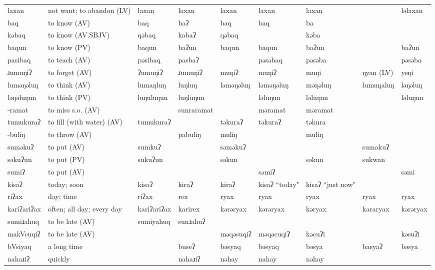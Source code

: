 \begin{landscape}
\begin{longtable}{*{9}{>{\raggedright\arraybackslash}p{}}}
\text{*}laxan & not want; to abandon (LV) & laxan & laxan & laxan & laxan & laxan &  & ləlaxan\\
\text{*}baq & to know (AV) & baq & baʔ & baq & baq & ba &  & \\
\text{*}kəbaq & to know (AV.SBJV) & qəbaq & kabaʔ & qəbaq &  & kəba &  & \\
\text{*}baqun & to know (PV) & baqun & baʔun & baqun & baqun & baʔun &  & baʔun\\
\text{*}pasibaq & to teach (AV) & pəsibaq & pasbaʔ &  & pəsəbaq & pəsəba &  & pəsəba\\
\text{*}ɹumuŋiʔ & to forget (AV) & ʔumuŋiʔ & ɹumuŋiʔ & muŋiʔ & muŋiʔ & muŋi & ŋyan (LV) & yeŋi\\
\text{*}luməŋəluŋ & to think (AV) & lumaŋluŋ & luŋluŋ & ləməŋəluŋ & ləməŋəluŋ & məŋəluŋ & lumuŋaluŋ & ləŋəluŋ\\
\text{*}ləŋəluŋun & to think (PV) & luŋuluŋun & luŋluŋun &  & ləluŋun & ləluŋun &  & ləluŋun\\
\text{*}-ramat & to miss s.o. (AV) &  & sunraramat &  & məramat & məramat &  & \\
\text{*}tumukuraʔ & to fill (with water) (AV) & tumukuraʔ &  & təkuraʔ & təkuraʔ & təkura &  & \\
\text{*}-buliŋ & to throw (AV) &  & pabuliŋ & muliŋ &  & muliŋ &  & \\
\text{*}suməkuʔ & to put (AV) & sumkuʔ &  & səməkuʔ &  &  & sumakuʔ & \\
\text{*}səkuʔun & to put (PV) & sukuʔun &  & səkun &  & səkun & sukwan & \\
\text{*}sumiʔ & to put (AV) &  &  &  & səmiʔ &  &  & səmi\\
\text{*}kisaʔ & today; soon & kisaʔ & kiraʔ & kiraʔ & kisaʔ ``today" & kisaʔ \newline ``just now" &  & \\
\text{*}riʔax & day; time & riʔax & rex & ryax & ryax & ryax & ryax & ryax\\
\text{*}kariʔariʔax & often; all day; every day & kariʔariʔax & karirex & kərəryax & kərəryax & kəryax & kararyax & kərəryax\\
\text{*}sumiɹahuq & to be late (AV) & sumiyahuq & sunɹahuʔ &  &  &  &  & \\
\text{*}makVcuqiʔ & to be late (AV) &  &  & məqəsuqiʔ & məqəcuqiʔ & kəcuʔi &  & kəsuʔi\\
\text{*}bVsiyaq & a long time &  & buseʔ & bəsyaq & bəsyaq & bəsya & basyaʔ & bəsya\\
\text{*}nahaɹiʔ & quickly &  & nahaɹiʔ & nəhay & nahay & nəhay &  & \\

\end{longtable}
\end{landscape}
